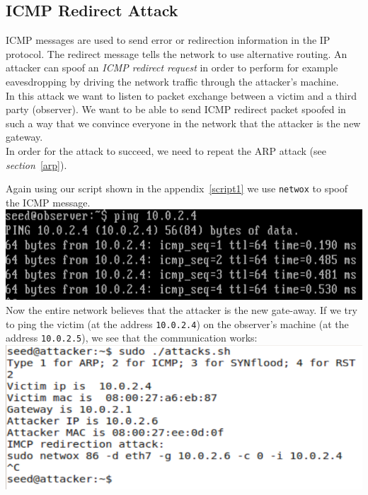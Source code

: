 \documentclass[12pt, a4paper, pdflatex]{article}
\begin{document}
\subsection{ICMP Redirect Attack}

ICMP messages are used to send error or redirection information in the IP protocol. The redirect message tells the network to use alternative routing. An attacker can spoof an \emph{ICMP redirect request} in order to perform for example eavesdropping by driving the network traffic through the attacker's machine.\\

In this attack we want to listen to packet exchange between a victim and a third party (observer). We want to be able to send ICMP redirect packet spoofed in such a way that we convince everyone in the network that the attacker is the new gateway.\\

In order for the attack to succeed, we need to repeat the ARP attack (see \emph{section}~\ref{arp}).

Again using our script shown in the appendix~\ref{script1} we use \texttt{netwox} to spoof the ICMP message.\\

\includegraphics[width=.95\textwidth]{gfx/imcp-ping}\\

Now the entire network believes that the attacker is the new gate-away. If we try to ping the victim (at the address \texttt{10.0.2.4}) on the observer's machine (at the address \texttt{10.0.2.5}), we see that the communication works:\\

\includegraphics[width=.95\textwidth]{gfx/imcp-netwox}\\
\end{document}
